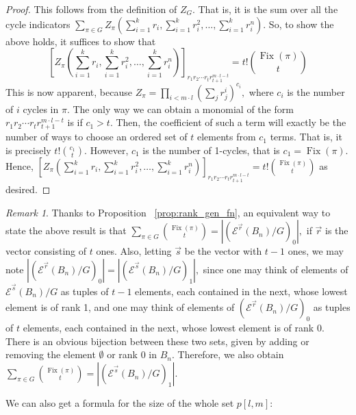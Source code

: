 \documentclass[10 pt]{amsart}
\theoremstyle{plain}
\theoremstyle{definition}
\theoremstyle{remark}
\numberwithin{equation}{section}
\theoremstyle{remark}
\newtheorem{rem}[thm]{Remark}
\renewcommand{\vec}[1]{\overrightarrow{#1}}
\def\Fix{\operatorname{Fix}}
\begin{document}
\begin{proof}
This follows from the definition of $Z_G.$ That is, it is the sum over all the cycle indicators $\sum_{\pi \in G}Z_\pi(\sum_{i=1}^k r_i,\sum_{i=1}^k r_i^2,\ldots, \sum_{i=1}^k r_i^n).$ So, to show the above holds, it suffices to show that
$$[Z_\pi(\sum_{i=1}^k r_i,\sum_{i=1}^k r_i^2,\ldots, \sum_{i=1}^k r_i^n)]_{r_1 r_2 \cdots r_t r_{t+1}^{m\cdot l - t}} =  t! \binom {\Fix(\pi)} t$$
This is now apparent, because $Z_\pi = \prod_{i < m \cdot l} (\sum_j r_j^i)^{c_i},$ where $c_i$ is the number of $i$ cycles in $\pi.$ The only way we can obtain a monomial of the form $r_1 r_2 \cdots r_t r_{t+1}^{m\cdot l - t}$ is if $c_1 > t.$ Then, the coefficient of such a term will exactly be the number of ways to choose an ordered set of $t$ elements from $c_1$ terms. That is, it is precisely $t!\binom {c_1} t.$ However, $c_1$ is the number of 1-cycles, that is $c_1 = \Fix(\pi).$ Hence, $[Z_\pi(\sum_{i=1}^k r_i,\sum_{i=1}^k r_i^2,\ldots, \sum_{i=1}^k r_i^n)]_{r_1 r_2 \cdots r_t r_{t+1}^{m\cdot l - t}} =  t!\binom {\Fix(\pi)} t$ as desired.
\end{proof}

\begin{rem}
\label{rem:box_partitions_relation_to_f}
Thanks to Proposition ~\ref{prop:rank_gen_fn}, an equivalent way to state the above result is that $\sum_{\pi \in G} \binom {\Fix(\pi)} t = |(\mathcal E^{\vec r}(B_n)/G)_0|,$ if $\vec r$ is the vector consisting of $t$ ones. Also, letting $\vec s$ be the vector with $t-1$ ones, we may note $ |(\mathcal E^{\vec r}(B_n)/G)_0| =  |(\mathcal E^{\vec s}(B_n)/G)_1|,$ since one may think of elements of 
$\mathcal E^{\vec s}(B_n)/G$ as tuples of $t-1$ elements, each contained in the next, whose lowest element is of rank 1, and one may think of elements of $(\mathcal E^{\vec r}(B_n)/G)_0$ as tuples of $t$ elements, each contained in the next, whose lowest element is of rank 0. There is an obvious bijection between these two sets, given by adding or removing the element $\emptyset$ or rank 0 in $B_n.$ Therefore, we also obtain $\sum_{\pi \in G} \binom {\Fix(\pi)} t = |(\mathcal E^{\vec s}(B_n)/G)_1|.$
\end{rem}

We can also get a formula for the size of the whole set $p[l,m]:$
\end{document}
